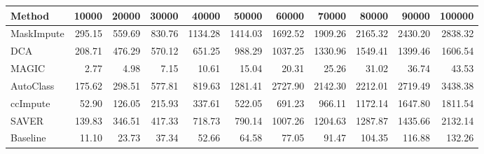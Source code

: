 \begin{tabular}{@{}lrrrrrrrrrr@{}}
\toprule
Method & 10000 & 20000 & 30000 & 40000 & 50000 & 60000 & 70000 & 80000 & 90000 & 100000 \\
\midrule
MaskImpute & 295.15 & 559.69 & 830.76 & 1134.28 & 1414.03 & 1692.52 & 1909.26 & 2165.32 & 2430.20 & 2838.32 \\
DCA & 208.71 & 476.29 & 570.12 & 651.25 & 988.29 & 1037.25 & 1330.96 & 1549.41 & 1399.46 & 1606.54 \\
MAGIC & 2.77 & 4.98 & 7.15 & 10.61 & 15.04 & 20.31 & 25.26 & 31.02 & 36.74 & 43.53 \\
AutoClass & 175.62 & 298.51 & 577.81 & 819.63 & 1281.41 & 2727.90 & 2142.30 & 2212.01 & 2719.49 & 3438.38 \\
ccImpute & 52.90 & 126.05 & 215.93 & 337.61 & 522.05 & 691.23 & 966.11 & 1172.14 & 1647.80 & 1811.54 \\
SAVER & 139.83 & 346.51 & 417.33 & 718.73 & 790.14 & 1007.26 & 1204.63 & 1287.87 & 1435.66 & 2132.14 \\
Baseline & 11.10 & 23.73 & 37.34 & 52.66 & 64.58 & 77.05 & 91.47 & 104.35 & 116.88 & 132.26 \\
\bottomrule
\end{tabular}
